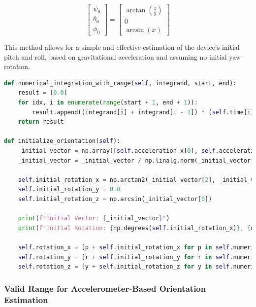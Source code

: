 \documentclass{article}
\begin{document}
    \[
        \begin{bmatrix}
            \psi_{0}   \\
            \theta_{0} \\
            \phi_{0}
        \end{bmatrix}
        =
        \begin{bmatrix}
            \arctan\left(\frac{z}{y}\right) \\
            0                               \\
            \arcsin(x)
        \end{bmatrix}
    \]

    This method allows for a simple and effective estimation of the device’s initial
    pitch and roll, based on gravitational acceleration and assuming no initial
    yaw rotation.

    \begin{lstlisting}[language=Python, caption={Orientation estimation using accelerometer data}, label={lst:orientation_estimation}]
def numerical_integration_with_range(self, integrand, start, end):
    result = [0.0]
    for idx, i in enumerate(range(start + 1, end + 1)):
        result.append((integrand[i] + integrand[i - 1]) * (self.time[i] - self.time[i - 1]) / 2 + result[idx - 1])
    return result

def initialize_orientation(self):
    _initial_vector = np.array([self.acceleration_x[0], self.acceleration_y[0], self.acceleration_z[0]])
    _initial_vector = _initial_vector / np.linalg.norm(_initial_vector)
    
    self.initial_rotation_x = np.arctan2(_initial_vector[2], _initial_vector[1])
    self.initial_rotation_y = 0.0
    self.initial_rotation_z = np.arcsin(_initial_vector[0])
    
    print(f"Initial Vector: {_initial_vector}")
    print(f"Initial Rotation: {np.degrees(self.initial_rotation_x)}, {np.degrees(self.initial_rotation_y)}, {np.degrees(self.initial_rotation_z)}")
    
    self.rotation_x = [p + self.initial_rotation_x for p in self.numerical_integration(self.gyro_x, self.time)]
    self.rotation_y = [r + self.initial_rotation_y for r in self.numerical_integration(self.gyro_y, self.time)]
    self.rotation_z = [y + self.initial_rotation_z for y in self.numerical_integration(self.gyro_z, self.time)]
\end{lstlisting}

    \subsubsection{Valid Range for Accelerometer-Based Orientation Estimation}
\end{document}
